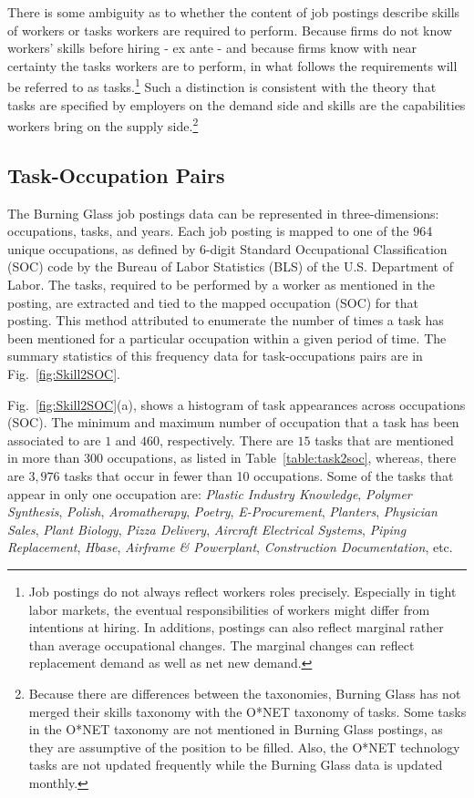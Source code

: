 \documentclass[letterpaper]{article} %
\begin{document}
There is some ambiguity as to whether the content of job postings describe skills of workers or tasks workers are required to perform. Because firms do not know workers' skills before hiring - ex ante - and because firms know with near certainty the tasks workers are to perform, in what follows the requirements will be referred to as tasks.\footnote{Job postings do not always reflect workers roles precisely. Especially in tight labor markets, the eventual responsibilities of workers might differ from intentions at hiring. In additions, postings can also reflect marginal rather than average occupational changes. The marginal changes can reflect replacement demand as well as net new demand.} Such a distinction is consistent with the theory that tasks are specified by employers on the demand side and skills are the capabilities workers bring on the supply side.\footnote{Because there are differences between the taxonomies, Burning Glass has not merged their skills taxonomy with the O*NET taxonomy of tasks. Some tasks in the O*NET taxonomy are not mentioned in Burning Glass postings, as they are assumptive of the position to be filled. Also, the O*NET technology tasks are not updated frequently while the Burning Glass data is updated monthly.}

\subsection{Task-Occupation Pairs}
\label{subsec:task-occ}
The Burning Glass job postings data can be represented in three-dimensions: occupations, tasks, and years. Each job posting is mapped to one of the 964 unique occupations, as defined by 6-digit Standard Occupational Classification (SOC) code by the Bureau of Labor Statistics (BLS) of the U.S. Department of Labor. The tasks, required to be performed by a worker as mentioned in the posting, are extracted and tied to the mapped occupation (SOC) for that posting. This method attributed to enumerate the number of times a task has been mentioned for a particular occupation within a given period of time. The summary statistics of this frequency data for task-occupations pairs are in Fig.~\ref{fig:Skill2SOC}.

Fig.~\ref{fig:Skill2SOC}(a), shows a histogram of task appearances across occupations (SOC). The minimum and maximum number of occupation that a task has been associated to are $1$ and $460$, respectively. There are $15$ tasks that are mentioned in more than $300$ occupations, as listed in Table~\ref{table:task2soc}, whereas, there are $3,976$ tasks that occur in fewer than 10 occupations. Some of the tasks that appear in only one occupation are:  {\it Plastic Industry Knowledge}, {\it Polymer Synthesis}, {\it Polish}, {\it Aromatherapy}, {\it Poetry}, {\it E-Procurement}, {\it Planters}, {\it Physician Sales}, {\it Plant Biology}, {\it Pizza Delivery}, {\it Aircraft Electrical Systems}, {\it Piping Replacement}, {\it Hbase}, {\it Airframe \& Powerplant}, {\it Construction Documentation}, etc.
\end{document}
